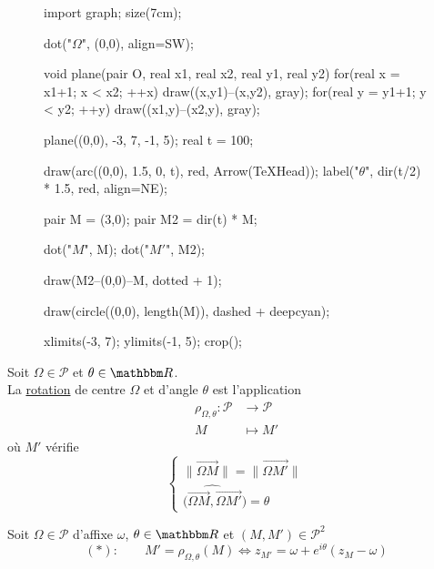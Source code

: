 \begin{defn}
	\begin{minipage}
		{\linewidth}
		\begin{wrapfigure}
			{r}{0.5\textwidth}
			\centering
			\begin{asy}
				import graph;
				size(7cm);

				dot("$\Omega$", (0,0), align=SW);

				void plane(pair O, real x1, real x2, real y1, real y2) {
					for(real x = x1+1; x < x2; ++x) draw((x,y1)--(x,y2), gray);
					for(real y = y1+1; y < y2; ++y) draw((x1,y)--(x2,y), gray);
				}

				plane((0,0), -3, 7, -1, 5);
				real t = 100;

				draw(arc((0,0), 1.5, 0, t), red, Arrow(TeXHead));
				label("$\theta$", dir(t/2) * 1.5, red, align=NE);

				pair M = (3,0);
				pair M2 = dir(t) * M;

				dot("$M$", M);
				dot("$M'$", M2);

				draw(M2--(0,0)--M, dotted + 1);

				draw(circle((0,0), length(M)), dashed + deepcyan);

				xlimits(-3, 7);
				ylimits(-1, 5);
				crop();
			\end{asy}
		\end{wrapfigure}
		Soit $\Omega \in \mathcal{P}$ et $\theta\in \R$.\\
		La \underline{rotation} de centre $\Omega$ et d'angle $\theta$ est l'application \begin{align*}
			\rho_{\Omega, \theta}: \mathcal{P} &\longrightarrow \mathcal{P} \\
			M &\longmapsto M'
		\end{align*} où  $M'$ vérifie  \[
			\begin{cases}
				\|\vec{\Omega M}\| = \|\vec{\Omega M'}\|\\
				\widehat{(\vec{\Omega M}, \vec{\Omega M'}}) = \theta
			\end{cases}
		\]
	\end{minipage}
\end{defn}

\begin{prop}
	Soit $\Omega \in \mathcal{P}$ d'affixe $\omega$, $\theta \in \R	$ et $(M, M') \in \mathcal{P}^2$ \[
		(*): \qquad M' = \rho_{\Omega, \theta}(M) \iff z_{M'} = \omega + e^{i\theta}(z_M - \omega)
	\] 
\end{prop}

